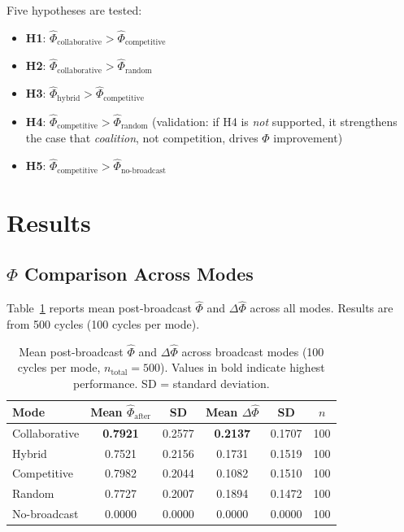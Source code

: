 \documentclass[11pt]{article}
\theoremstyle{definition}
\begin{document}
Five hypotheses are tested:
\begin{itemize}[noitemsep]
\item \textbf{H1}: $\hat{\Phi}_{\text{collaborative}} > \hat{\Phi}_{\text{competitive}}$
\item \textbf{H2}: $\hat{\Phi}_{\text{collaborative}} > \hat{\Phi}_{\text{random}}$
\item \textbf{H3}: $\hat{\Phi}_{\text{hybrid}} > \hat{\Phi}_{\text{competitive}}$
\item \textbf{H4}: $\hat{\Phi}_{\text{competitive}} > \hat{\Phi}_{\text{random}}$
  (validation: if H4 is \emph{not} supported, it strengthens the case that \emph{coalition},
  not competition, drives $\Phi$ improvement)
\item \textbf{H5}: $\hat{\Phi}_{\text{competitive}} > \hat{\Phi}_{\text{no-broadcast}}$
\end{itemize}


\section{Results}
\label{sec:results}

\subsection{$\hat{\Phi}$ Comparison Across Modes}

Table~\ref{tab:phi} reports mean post-broadcast $\hat{\Phi}$ and $\Delta\hat{\Phi}$ across
all modes. Results are from 500 cycles (100 cycles per mode).

\begin{table}[h]
\caption{Mean post-broadcast $\hat{\Phi}$ and $\Delta\hat{\Phi}$ across broadcast modes
(100 cycles per mode, $n_{\text{total}} = 500$). Values in bold indicate highest performance.
SD = standard deviation.}
\label{tab:phi}
\centering
\begin{tabular}{lccccc}
\toprule
\textbf{Mode} & \textbf{Mean $\hat{\Phi}_{\text{after}}$} & \textbf{SD} &
  \textbf{Mean $\Delta\hat{\Phi}$} & \textbf{SD} & \textbf{$n$} \\
\midrule
Collaborative & \textbf{0.7921} & 0.2577 & \textbf{0.2137} & 0.1707 & 100 \\
Hybrid        & 0.7521 & 0.2156 & 0.1731 & 0.1519 & 100 \\
Competitive   & 0.7982 & 0.2044 & 0.1082 & 0.1510 & 100 \\
Random        & 0.7727 & 0.2007 & 0.1894 & 0.1472 & 100 \\
No-broadcast  & 0.0000 & 0.0000 & 0.0000 & 0.0000 & 100 \\
\bottomrule
\end{tabular}
\end{table}
\end{document}
